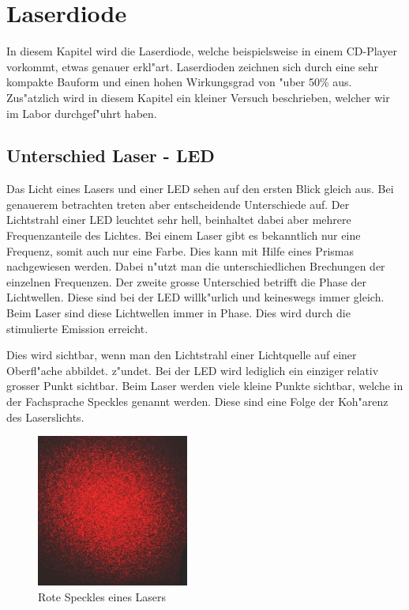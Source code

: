 \begin{refsection}
\begin{flushleft}
\begin{figure}
\end{figure}
\end{flushleft}

\section{Laserdiode
\label{Laserdiode}}
In diesem Kapitel wird die Laserdiode, welche beispielsweise in einem CD-Player
vorkommt, etwas genauer erkl"art. Laserdioden zeichnen sich durch eine sehr kompakte Bauform 
und einen hohen Wirkungsgrad von "uber 50\% aus. Zus"atzlich wird in diesem Kapitel
ein kleiner Versuch beschrieben, welcher wir im Labor durchgef"uhrt haben.  

\subsection{Unterschied Laser - LED
\label{Unterschied Laser - LED}}
%
Das Licht eines Lasers und einer LED sehen auf den ersten Blick gleich aus.
Bei genauerem betrachten treten aber entscheidende Unterschiede auf.
Der Lichtstrahl einer LED leuchtet sehr hell, beinhaltet dabei aber mehrere
Frequenzanteile des Lichtes.
Bei einem Laser gibt es bekanntlich nur eine Frequenz,
somit auch nur eine Farbe.
Dies kann mit Hilfe eines Prismas nachgewiesen werden.
Dabei n"utzt man die unterschiedlichen Brechungen der einzelnen Frequenzen.
Der zweite grosse Unterschied betrifft die Phase der Lichtwellen.
Diese sind bei der LED willk"urlich und keineswegs immer gleich.
Beim Laser sind diese Lichtwellen immer in Phase.
Dies wird durch die stimulierte Emission erreicht.

Dies wird sichtbar, wenn man den Lichtstrahl einer Lichtquelle
auf einer Oberfl"ache abbildet.
z"undet. Bei der LED wird lediglich ein einziger relativ grosser Punkt 
sichtbar. Beim Laser werden viele kleine Punkte sichtbar, welche in der
Fachsprache Speckles genannt werden.
Diese sind eine Folge der Koh"arenz des Laserslichts.

\begin{figure}
\centering
\includegraphics[width = 5cm]{laser/bilder/Objective_speckle.jpg}
\caption{Rote Speckles eines Lasers \cite{WikiSpeckle}}
\end{figure}


\end{refsection}
